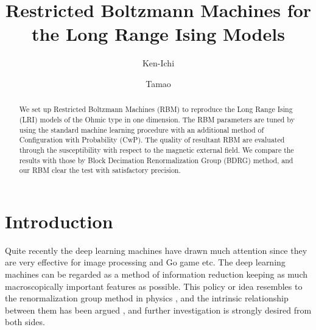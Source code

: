\documentclass[a4paper,preprint,superscriptaddress,preprintnumbers,nofootinbib]{revtex4}
\begin{document}
\title{Restricted Boltzmann Machines for the Long Range Ising Models}
\author{Ken-Ichi }
\author{Tamao }
\begin{abstract}
We set up Restricted Boltzmann Machines (RBM) to reproduce the Long Range
Ising (LRI) models of the Ohmic type in one dimension.
The RBM parameters are tuned by using the standard machine
learning procedure with an additional method of 
Configuration with Probability (CwP).
The quality of resultant RBM are evaluated through the susceptibility with respect to 
the magnetic external field.
We compare the results with those by Block Decimation Renormalization Group
(BDRG) method, and our RBM clear the test with satisfactory precision.

\end{abstract}
\maketitle


\section{Introduction}
Quite recently the deep learning machines have drawn much attention
since they are very effective for image processing \cite{Xie12} and Go game \cite{Go16} etc.
The deep learning machines can be regarded as a method of
information reduction keeping as much macroscopically 
important features as possible.
This policy or idea resembles to the renormalization group method
in physics \cite{Wilson75,NPRG}, and the intrinsic relationship between them 
has been argued \cite{VRG-DL}, and further investigation is strongly desired from
both sides.
\end{document}
